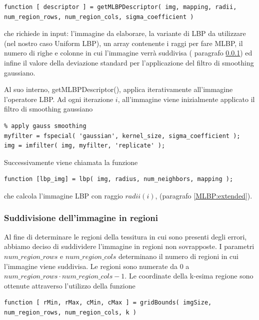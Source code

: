 \begin{lstlisting}
function [ descriptor ] = getMLBPDescriptor( img, mapping, radii, num_region_rows, num_region_cols, sigma_coefficient )
\end{lstlisting}

che richiede in input: l'immagine da elaborare, la variante di \acs{LBP} da utilizzare (nel nostro caso Uniform LBP), un array contenente i raggi per fare \acs{MLBP}, il numero di righe e colonne in cui l'immagine verrà suddivisa ( paragrafo \ref{imp:seg}) ed infine il valore della deviazione standard per l'applicazione del filtro di smoothing gaussiano.

Al suo interno, getMLBPDescriptor(), applica iterativamente all'immagine l'operatore \acs{LBP}.
Ad ogni iterazione $i$, all'immagine viene inizialmente applicato il filtro di smoothing gaussiano

\begin{lstlisting}
% apply gauss smoothing
myfilter = fspecial( 'gaussian', kernel_size, sigma_coefficient );
img = imfilter( img, myfilter, 'replicate' );
\end{lstlisting}

\noindent Successivamente viene chiamata la funzione\cite{lbpcode}

\begin{lstlisting}
function [lbp_img] = lbp( img, radius, num_neighbors, mapping );
\end{lstlisting}

\noindent che calcola l'immagine \acs{LBP} con raggio $radii(i)$, (paragrafo \ref{MLBP:extended}).

\subsubsection{Suddivisione dell'immagine in regioni}
\label{imp:seg}
Al fine di determinare le regioni della tessitura in cui sono presenti degli errori, abbiamo deciso di suddividere l'immagine in regioni non sovrapposte. I parametri $num\_region\_rows$ e $num\_region\_cols$ determinano il numero di regioni in cui l'immagine viene suddivisa.
Le regioni sono numerate da $0$ a $num\_region\_rows \cdot num\_region\_cols - 1$.
Le coordinate della k-esima regione sono ottenute attraverso l'utilizzo della funzione

\begin{lstlisting}
function [ rMin, rMax, cMin, cMax ] = gridBounds( imgSize, num_region_rows, num_region_cols, k )
\end{lstlisting}

